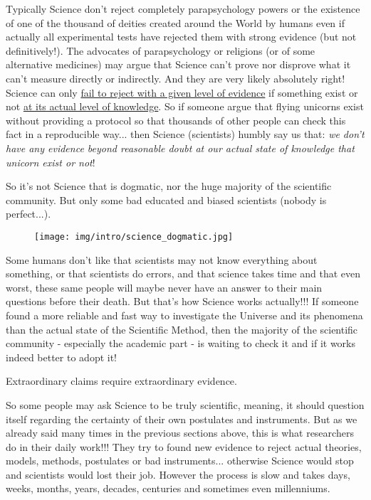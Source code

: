 	Typically Science don't reject completely parapsychology powers or the existence of one of the thousand of deities created around the World by humans even if actually all experimental tests have rejected them with strong evidence (but not definitively!). The advocates of parapsychology or religions (or of some alternative medicines) may argue that Science can't prove nor disprove what it can't measure directly or indirectly. And they are very likely absolutely right! Science can only \underline{fail to reject with a given level of evidence} if something exist or not \underline{at its actual level of knowledge}. So if someone argue that flying unicorns exist without providing a protocol so that thousands of other people can check this fact in a reproducible way... then Science (scientists) humbly say us that: \textit{we don't have any evidence beyond reasonable doubt at our actual state of knowledge that unicorn exist or not}!
	
	So it's not Science that is dogmatic, nor the huge majority of the scientific community. But only some bad educated and biased scientists (nobody is perfect...).
	
	\begin{figure}[H]
		\centering
		\texttt{[image: img/intro/science\_dogmatic.jpg]}
	\end{figure}
	
	Some humans don't like that scientists may not know everything about something, or that scientists do errors, and that science takes time and that even worst, these same people will maybe never have an answer to their main questions before their death. But that's how Science works actually!!! If someone found a more reliable and fast way to investigate the Universe and its phenomena than the actual state of the Scientific Method, then the majority of the scientific community - especially the academic part - is waiting to check it and if it works indeed better to adopt it!
	
	\begin{fquote}Extraordinary claims require extraordinary evidence.
 	\end{fquote}

	 So some people may ask Science to be truly scientific, meaning, it should question itself regarding the certainty of their own postulates and instruments. But as we already said many times in the previous sections above, this is what researchers do in their daily work!!! They try to found new evidence to reject actual theories, models, methods, postulates or bad instruments... otherwise Science would stop and scientists would lost their job. However the process is slow and takes days, weeks, months, years, decades, centuries and sometimes even millenniums.
	 
